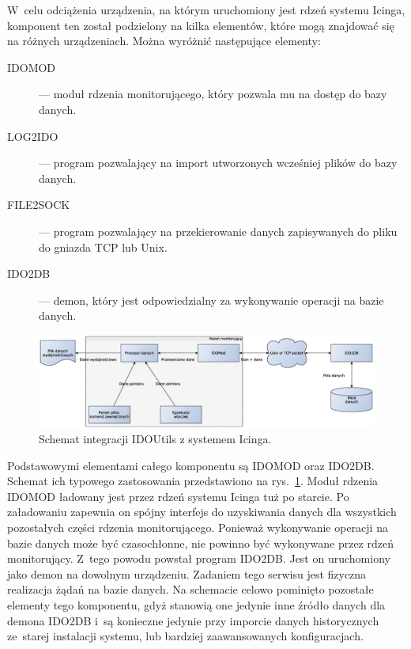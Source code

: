 W~celu odciążenia urządzenia, na którym uruchomiony jest rdzeń systemu
Icinga, komponent ten został podzielony na kilka elementów, które mogą
znajdować się na różnych urządzeniach. Można wyróżnić następujące
elementy:

\begin{description}
\item[IDOMOD] --- moduł rdzenia monitorującego, który pozwala mu na dostęp
  do bazy danych.
\item[LOG2IDO] --- program pozwalający na import utworzonych wcześniej
  plików do bazy danych.
\item[FILE2SOCK] --- program pozwalający na przekierowanie danych
  zapisywanych do pliku do gniazda TCP lub Unix.
\item[IDO2DB] --- demon, który jest odpowiedzialny za wykonywanie operacji
  na bazie danych.
\end{description}

\begin{figure}[ht]
  \caption{Schemat integracji IDOUtils z systemem Icinga.}
  \label{fig:IDOUtilsArch}
\includegraphics[width=1\textwidth]{img/idoutilsArch}
\end{figure}

Podstawowymi elementami całego komponentu są IDOMOD oraz
IDO2DB. Schemat ich typowego zastosowania przedstawiono na
rys.~\ref{fig:IDOUtilsArch}. Moduł rdzenia IDOMOD ładowany jest przez
rdzeń systemu Icinga tuż po starcie. Po załadowaniu zapewnia on spójny
interfejs do uzyskiwania danych dla wszystkich pozostałych części
rdzenia monitorującego. Ponieważ wykonywanie operacji na bazie danych
może być czasochłonne, nie powinno być wykonywane przez rdzeń
monitorujący. Z~tego powodu powstał program IDO2DB. Jest on
uruchomiony jako demon na dowolnym urządzeniu. Zadaniem tego serwisu
jest fizyczna realizacja żądań na bazie danych. Na schemacie celowo
pominięto pozostałe elementy tego komponentu, gdyż stanowią one
jedynie inne źródło danych dla demona IDO2DB i~są konieczne jedynie
przy imporcie danych historycznych ze~starej instalacji systemu, lub
bardziej zaawansowanych konfiguracjach.

